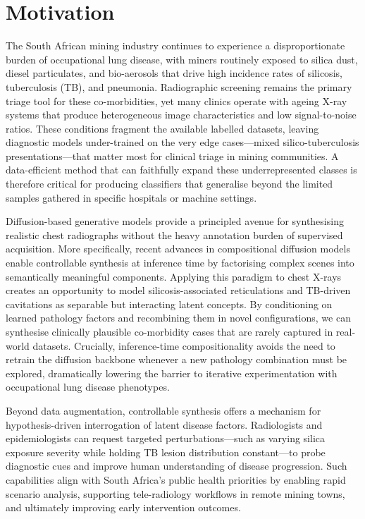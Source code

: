 \section{Motivation}
The South African mining industry continues to experience a disproportionate burden of occupational lung disease, with miners routinely exposed to silica dust, diesel particulates, and bio-aerosols that drive high incidence rates of silicosis, tuberculosis (TB), and pneumonia. Radiographic screening remains the primary triage tool for these co-morbidities, yet many clinics operate with ageing X-ray systems that produce heterogeneous image characteristics and low signal-to-noise ratios. These conditions fragment the available labelled datasets, leaving diagnostic models under-trained on the very edge cases---mixed silico-tuberculosis presentations---that matter most for clinical triage in mining communities. A data-efficient method that can faithfully expand these underrepresented classes is therefore critical for producing classifiers that generalise beyond the limited samples gathered in specific hospitals or machine settings.

Diffusion-based generative models provide a principled avenue for synthesising realistic chest radiographs without the heavy annotation burden of supervised acquisition. More specifically, recent advances in compositional diffusion models enable controllable synthesis at inference time by factorising complex scenes into semantically meaningful components. Applying this paradigm to chest X-rays creates an opportunity to model silicosis-associated reticulations and TB-driven cavitations as separable but interacting latent concepts. By conditioning on learned pathology factors and recombining them in novel configurations, we can synthesise clinically plausible co-morbidity cases that are rarely captured in real-world datasets. Crucially, inference-time compositionality avoids the need to retrain the diffusion backbone whenever a new pathology combination must be explored, dramatically lowering the barrier to iterative experimentation with occupational lung disease phenotypes.

Beyond data augmentation, controllable synthesis offers a mechanism for hypothesis-driven interrogation of latent disease factors. Radiologists and epidemiologists can request targeted perturbations---such as varying silica exposure severity while holding TB lesion distribution constant---to probe diagnostic cues and improve human understanding of disease progression. Such capabilities align with South Africa's public health priorities by enabling rapid scenario analysis, supporting tele-radiology workflows in remote mining towns, and ultimately improving early intervention outcomes.